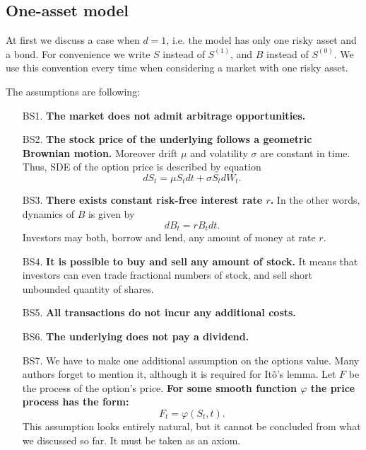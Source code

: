 \documentclass[a4paper,11pt, twoside]{book}
\theoremstyle{definition}
\theoremstyle{remark}
\begin{document}
\subsection{One-asset model}
At first we discuss a case when $d=1$, i.e. the model has only one risky asset and a bond. For convenience we write $S$ instead of $S^{(1)}$, and $B$ instead of $S^{(0)}$. We use this convention every time when considering a market with one risky asset.

The assumptions are following:
\begin{enumerate}
  \item[BS1.] \textbf{The market does not admit arbitrage opportunities.}

 \item[BS2.] \textbf{The stock price of the underlying follows a geometric Brownian motion.} Moreover drift $\mu$ and volatility $\sigma$ are constant in time. Thus, SDE of the option price is described by equation
\begin{equation}
 \label{eq:BS_dynamics}
 dS_t = \mu S_t dt + \sigma S_t dW_t. 
\end{equation}
 
  \item[BS3.] \textbf{There exists constant risk-free interest rate $r$.} In the other words, dynamics of $B$ is given by 
\[ dB_t = rB_t dt. \]
Investors may both, borrow and lend, any amount of money at rate $r$.

  \item[BS4.] \textbf{It is possible to buy and sell any amount of stock.} It means that investors can even trade fractional numbers of stock, and sell short unbounded quantity of shares.

  \item[BS5.] \textbf{All transactions do not incur any additional costs.}

  \item[BS6.] \textbf{The underlying does not pay a dividend.}
  
  \item[BS7.] We have to make one additional assumption on the options value. Many authors forget to mention it, although it is required for It\^{o}'s lemma. Let $F$ be the process of the option's price\footnotemark.
  \textbf{For some smooth function $\varphi$ the price process has the form:}
    \begin{equation}
    \label{eq:PriceProcessForm}
    F_t = \varphi(S_t, t).
    \end{equation}
This assumption looks entirely natural, but it cannot be concluded from what we discussed so far. It must be taken as an axiom.
\end{enumerate}
\end{document}
